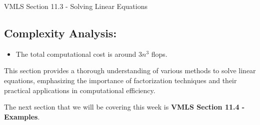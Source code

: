 \begin{notes}{VMLS Section 11.3 - Solving Linear Equations}
    \subsection*{Complexity Analysis:}
    \begin{itemize}
        \item The total computational cost is around $3n^3$ flops.
    \end{itemize}

    This section provides a thorough understanding of various methods to solve linear equations, emphasizing the importance of factorization techniques and their practical applications in 
    computational efficiency.
\end{notes}

The next section that we will be covering this week is \textbf{VMLS Section 11.4 - Examples}.

